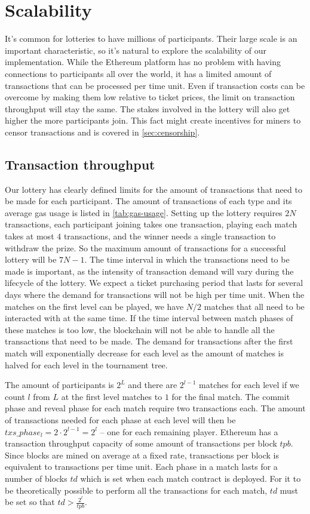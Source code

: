 \section{Scalability}
\label{sec:scalability}

It's common for lotteries to have millions of participants. Their large scale is an important characteristic, so it's natural to explore the scalability of our implementation. While the Ethereum platform has no problem with having connections to participants all over the world, it has a limited amount of transactions that can be processed per time unit. Even if transaction costs can be overcome by making them low relative to ticket prices, the limit on transaction throughput will stay the same. The stakes involved in the lottery will also get higher the more participants join. This fact might create incentives for miners to censor transactions and is covered in \ref{sec:censorship}.

\subsection{Transaction throughput}

Our lottery has clearly defined limits for the amount of transactions that need to be made for each participant. The amount of transactions of each type and its average gas usage is listed in \ref{tab:gas-usage}. Setting up the lottery requires $2N$ transactions, each participant joining takes one transaction, playing each match takes at most $4$ transactions, and the winner needs a single transaction to withdraw the prize. So the maximum amount of transactions for a successful lottery will be $7N-1$.  
The time interval in which the transactions need to be made is important, as the intensity of transaction demand will vary during the lifecycle of the lottery. We expect a ticket purchasing period that lasts for several days where the demand for transactions will not be high per time unit. When the matches on the first level can be played, we have $N/2$ matches that all need to be interacted with at the same time. If the time interval between match phases of these matches is too low, the blockchain will not be able to handle all the transactions that need to be made. The demand for transactions after the first match will exponentially decrease for each level as the amount of matches is halved for each level in the tournament tree.

The amount of participants is $2^L$ and there are $2^{l-1}$ matches for each level if we count $l$ from $L$ at the first level matches to $1$ for the final match. The commit phase and reveal phase for each match require two transactions each. The amount of transactions needed for each phase at each level will then be $txs\_phase_{l}=2 \cdot 2^{l-1}=2^l$ – one for each remaining player. Ethereum has a transaction throughput capacity of some amount of transactions per block $tpb$. Since blocks are mined on average at a fixed rate, transactions per block is equivalent to transactions per time unit.
Each phase in a match lasts for a number of blocks $td$ which is set when each match contract is deployed. For it to be theoretically possible to perform all the transactions for each match, $td$ must be set so that $td > \frac{2^{l}}{tpb}$.


